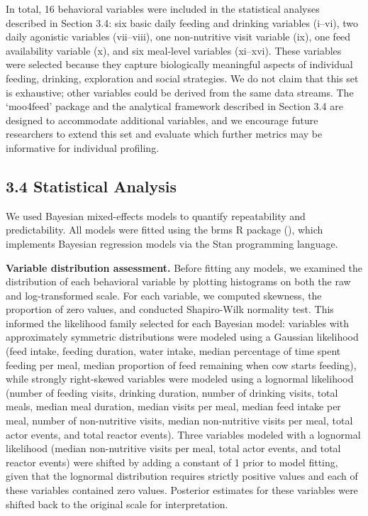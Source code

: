 \documentclass[
]{article}
\begin{document}
In total, 16 behavioral variables were included in the statistical
analyses described in Section 3.4: six basic daily feeding and drinking
variables (i--vi), two daily agonistic variables (vii--viii), one
non-nutritive visit variable (ix), one feed availability variable (x),
and six meal-level variables (xi--xvi). These variables were selected
because they capture biologically meaningful aspects of individual
feeding, drinking, exploration and social strategies. We do not claim
that this set is exhaustive; other variables could be derived from the
same data streams. The `moo4feed' package and the analytical framework
described in Section 3.4 are designed to accommodate additional
variables, and we encourage future researchers to extend this set and
evaluate which further metrics may be informative for individual
profiling.

\subsection{3.4 Statistical Analysis}\label{statistical-analysis}

We used Bayesian mixed-effects models to quantify repeatability and
predictability. All models were fitted using the brms R package
(), which implements
Bayesian regression models via the Stan programming language.

\textbf{Variable distribution assessment.} Before fitting any models, we
examined the distribution of each behavioral variable by plotting
histograms on both the raw and log-transformed scale. For each variable,
we computed skewness, the proportion of zero values, and conducted
Shapiro-Wilk normality test. This informed the likelihood family
selected for each Bayesian model: variables with approximately symmetric
distributions were modeled using a Gaussian likelihood (feed intake,
feeding duration, water intake, median percentage of time spent feeding
per meal, median proportion of feed remaining when cow starts feeding),
while strongly right-skewed variables were modeled using a lognormal
likelihood (number of feeding visits, drinking duration, number of
drinking visits, total meals, median meal duration, median visits per
meal, median feed intake per meal, number of non-nutritive visits,
median non-nutritive visits per meal, total actor events, and total
reactor events). Three variables modeled with a lognormal likelihood
(median non-nutritive visits per meal, total actor events, and total
reactor events) were shifted by adding a constant of 1 prior to model
fitting, given that the lognormal distribution requires strictly
positive values and each of these variables contained zero values.
Posterior estimates for these variables were shifted back to the
original scale for interpretation.
\end{document}
